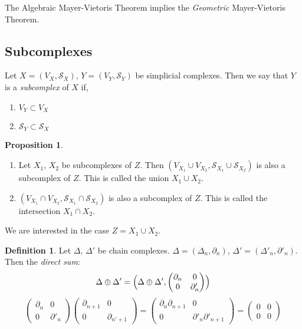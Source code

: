 \documentclass[a4paper,14pt]{extarticle}
\theoremstyle{definition}
\newtheorem*{definition}{Definition}
\newtheorem*{proposition}{Proposition}
\begin{document}
The Algebraic Mayer-Vietoris Theorem implies the \emph{Geometric}
Mayer-Vietoris Theorem.

\subsection{Subcomplexes}
Let $X=(V_X, \mathcal{S}_X), \,Y=(V_Y, \mathcal{S}_Y)$ be simplicial complexes.
Then we say that $Y$ is a \emph{subcomplex} of $X$ if,
\begin{enumerate}
	\item $V_Y\subset V_X$
	\item $\mathcal{S}_Y \subset \mathcal{S}_X$
\end{enumerate}

\begin{proposition} \hfill
	\begin{enumerate}
		\item Let $X_1, \,X_2$ be subcomplexes of $Z$. Then 
				$(V_{X_1}\cup V_{X_2}, \mathcal{S}_{X_1}\cup \mathcal{S}_{X_2})$
				is also a subcomplex of $Z$. This is called the
				union $X_1\cup X_2$.
		\item $(V_{X_1}\cap V_{X_2}, \mathcal{S}_{X_1}\cap\mathcal{S}_{X_2})$
				is also a subcomplex of $Z$. This is 
				called the intersection $X_1\cap X_2$.
	\end{enumerate}
	We are
	interested in the case $Z=X_1\cup X_2$.
\end{proposition}

\begin{definition}
	Let $\Delta, \,\Delta'$ be chain complexes. $\Delta=(\Delta_n,\partial_n)$,
	$\Delta'=(\Delta'_n,\partial'_n)$. Then the \emph{direct sum}:
	\[\Delta\oplus\Delta'=\Bigl(\Delta\oplus\Delta',\begin{pmatrix}
		\partial_n & 0 \\ 0 & \partial'_n
	\end{pmatrix}\Bigr)\]
	\[
		\begin{pmatrix}
			\partial_n & 0 \\ 0 & \partial'_n
		\end{pmatrix}
		\begin{pmatrix}
			\partial_{n+1} & 0 \\ 0 & \partial_{n'+1}
		\end{pmatrix}
		=
		\begin{pmatrix}
			\partial_n\partial_{n+1} & 0 \\ 0 & \partial'_n\partial'_{n+1}
		\end{pmatrix}
		=
		\begin{pmatrix}
			0 & 0 \\ 0 & 0
		\end{pmatrix}
	\]
\end{definition}
\end{document}
